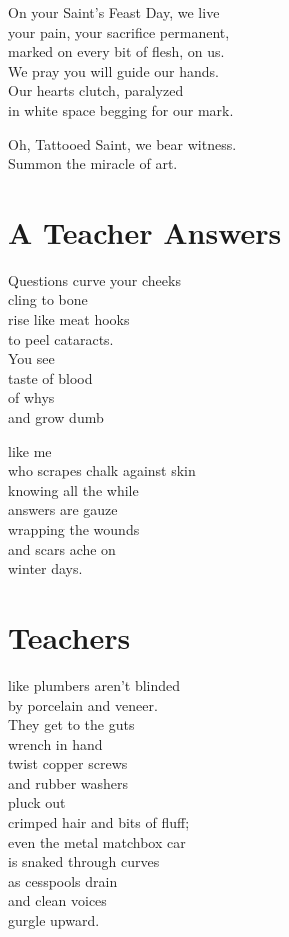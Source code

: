\documentclass[twoside,10pt]{book}
\begin{document}
On your Saint's Feast Day, we live\\
your pain, your sacrifice permanent,\\
marked on every bit of flesh, on us.\\
We pray you will guide our hands.\\
Our hearts clutch, paralyzed\\
in white space begging for our mark.

Oh, Tattooed Saint, we bear witness.\\
Summon the miracle of art.


\clearpage
\section{A Teacher Answers}

Questions curve your cheeks\\
cling to bone\\
rise like meat hooks\\
to peel cataracts.\\
You see\\
taste of blood\\
of whys\\
and grow dumb

like me\\
who scrapes chalk against skin\\
knowing all the while\\
answers are gauze\\
wrapping the wounds\\
and scars ache on\\
winter days.


\clearpage
\section{Teachers}

like plumbers aren't blinded\\
by porcelain and veneer.\\
They get to the guts\\
wrench in hand\\
twist copper screws\\
and rubber washers\\
pluck out\\
crimped hair and bits of fluff;\\
even the metal matchbox car\\
is snaked through curves\\
as cesspools drain\\
and clean voices\\
gurgle upward.
\end{document}
